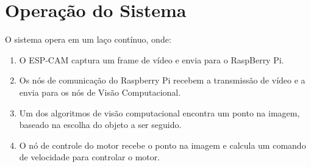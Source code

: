 \section{Operação do Sistema}
O sistema opera em um laço contínuo, onde:
\begin{enumerate}
    \item O ESP-CAM captura um frame de vídeo e envia para o RaspBerry Pi.
    \item Os nós de comunicação do Raspberry Pi recebem a transmissão de vídeo e a envia para os nós de Visão Computacional.
    \item Um dos algoritmos de visão computacional encontra um ponto na imagem, baseado na escolha do objeto a ser seguido.
    \item O nó de controle do motor recebe o ponto na imagem e calcula um comando de velocidade para controlar o motor.
\end{enumerate}
